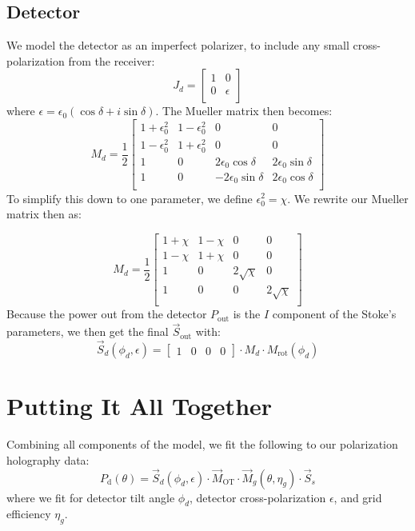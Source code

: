\subsection{Detector}
We model the detector as an imperfect polarizer, to include any small cross-polarization from the receiver:
\begin{equation}
    J_{d} = \begin{bmatrix}
    1 & 0 \\
    0 & \epsilon\\
  \end{bmatrix}
\end{equation}
where $\epsilon = \epsilon_0(\cos\delta + i\sin\delta)$.  The Mueller matrix then becomes:
\begin{equation}
    M_{d} = \frac{1}{2}\begin{bmatrix}
    1+\epsilon_0^2 & 1-\epsilon_0^2 & 0 & 0\\
    1-\epsilon_0^2 & 1+\epsilon_0^2 & 0 & 0\\
    1 & 0 & 2\epsilon_0\cos\delta & 2\epsilon_0\sin\delta\\
    1 & 0 & -2\epsilon_0\sin\delta & 2\epsilon_0\cos\delta\\
  \end{bmatrix}
\end{equation}
To simplify this down to one parameter, we define $\epsilon_0^2 = \chi$.  We rewrite our Mueller matrix then as:

\begin{equation}
    M_{d} = \frac{1}{2}\begin{bmatrix}
    1+\chi & 1-\chi & 0 & 0\\
    1-\chi & 1+\chi & 0 & 0\\
    1 & 0 & 2\sqrt{\chi} & 0\\
    1 & 0 & 0 & 2\sqrt{\chi}\\
  \end{bmatrix}
\end{equation}
Because the power out from the detector $P_{\text{out}}$ is the $I$ component of the Stoke's parameters, we then get the final $\vec{S}_{\text{out}}$ with:
\begin{equation}
    \vec{S}_{d}(\phi_d,\epsilon) = \begin{bmatrix}
    1 & 0 & 0 & 0
  \end{bmatrix} \cdot M_{d} \cdot M_{\text{rot}}(\phi_d)
\end{equation}

\section{Putting It All Together}
Combining all components of the model, we fit the following to our polarization holography data:
\begin{equation}
    P_{\text{d}}(\theta) = \vec{S}_{d}(\phi_{d},\epsilon)\cdot \vec{M}_{\text{OT}}\cdot \vec{M}_{g}(\theta,\eta_{g})\cdot \vec{S}_{s}
\end{equation}
where we fit for detector tilt angle $\phi_d$, detector cross-polarization $\epsilon$, and grid efficiency $\eta_g$.